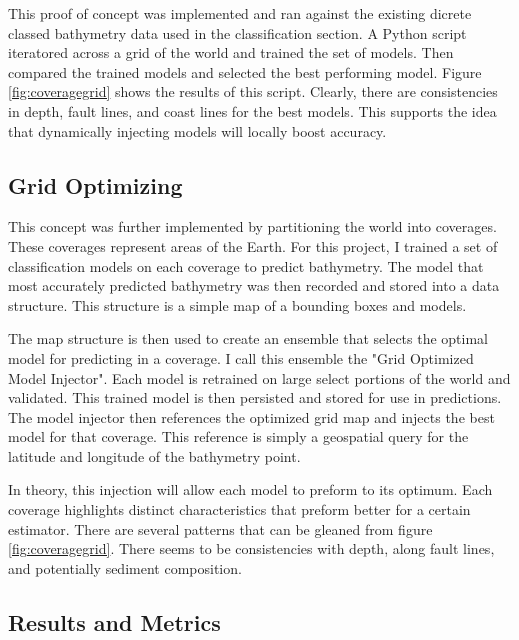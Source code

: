 \par
This proof of concept was implemented and ran against the existing dicrete classed bathymetry data used in the classification section.
A Python script iteratored across a grid of the world and trained the set of models.
Then compared the trained models and selected the best performing model.
Figure \ref{fig:coveragegrid} shows the results of this script.
Clearly, there are consistencies in depth, fault lines, and coast lines for the best models.
This supports the idea that dynamically injecting models will locally boost accuracy.

\subsection{Grid Optimizing}
This concept was further implemented by partitioning the world into coverages.
These coverages represent areas of the Earth.
For this project, I trained a set of classification models on each coverage to predict bathymetry.
The model that most accurately predicted bathymetry was then recorded and stored into a data structure.
This structure is a simple map of a bounding boxes and models.

\par
The map structure is then used to create an ensemble that selects the optimal model for predicting in a coverage.
I call this ensemble the "Grid Optimized Model Injector".
Each model is retrained on large select portions of the world and validated.
This trained model is then persisted and stored for use in predictions.
The model injector then references the optimized grid map and injects the best model for that coverage.
This reference is simply a geospatial query for the latitude and longitude of the bathymetry point.

\par
In theory, this injection will allow each model to preform to its optimum.
Each coverage highlights distinct characteristics that preform better for a certain estimator.
There are several patterns that can be gleaned from figure \ref{fig:coveragegrid}. 
There seems to be consistencies with depth, along fault lines, and potentially sediment composition. 


\subsection{Results and Metrics}

